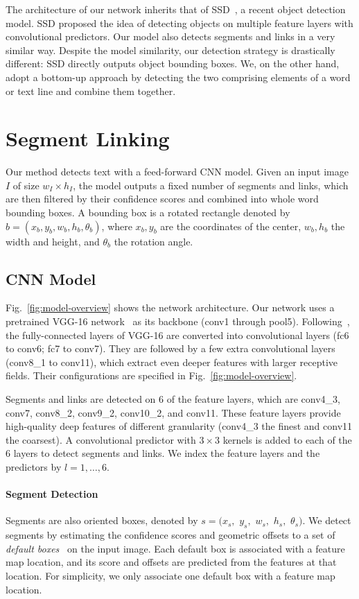 \documentclass[10pt,twocolumn,letterpaper]{article}
\begin{document}
The architecture of our network inherits that of SSD~\cite{eccv/LiuAESRFB16}, a recent object detection model.
SSD proposed the idea of detecting objects on multiple feature layers with convolutional predictors.
Our model also detects segments and links in a very similar way.
Despite the model similarity, our detection strategy is drastically different: SSD directly outputs object bounding boxes. We, on the other hand, adopt a bottom-up approach by detecting the two comprising elements of a word or text line and combine them together.

\section{Segment Linking}

Our method detects text with a feed-forward CNN model. Given an input image $I$ of size $w_{I}\times h_{I}$, the model outputs a fixed number of segments and links, which are then filtered by their confidence scores and combined into whole word bounding boxes.
A bounding box is a rotated rectangle denoted by $b = (x_b, y_b, w_b, h_b, \theta_b)$, where $x_b, y_b$ are the coordinates of the center, $w_b, h_b$ the width and height, and $\theta_b$ the rotation angle.

\subsection{CNN Model}

Fig.~\ref{fig:model-overview} shows the network architecture.
Our network uses a pretrained VGG-16 network~\cite{corr/SimonyanZ14a} as its backbone (conv1 through pool5).
Following~\cite{eccv/LiuAESRFB16}, the fully-connected layers of VGG-16 are converted into convolutional layers (fc6 to conv6; fc7 to conv7).
They are followed by a few extra convolutional layers (conv8\_1 to conv11), which extract even deeper features with larger receptive fields.
Their configurations are specified in Fig.~\ref{fig:model-overview}.

Segments and links are detected on 6 of the feature layers, which are conv4\_3, conv7, conv8\_2, conv9\_2, conv10\_2, and conv11.
These feature layers provide high-quality deep features of different granularity (conv4\_3 the finest and conv11 the coarsest).
A convolutional predictor with $3 \times 3$ kernels is added to each of the 6 layers to detect segments and links.
We index the feature layers and the predictors by $l=1,\dots,6$.

\paragraph{Segment Detection}
Segments are also oriented boxes, denoted by $s=(x_{s},$ $y_{s},$ $w_{s},$ $h_{s},$ $\theta_{s})$.
We detect segments by estimating the confidence scores and geometric offsets to a set of \emph{default boxes}~\cite{eccv/LiuAESRFB16} on the input image.
Each default box is associated with a feature map location, and its score and offsets are predicted from the features at that location.
For simplicity, we only associate one default box with a feature map location.
\end{document}
